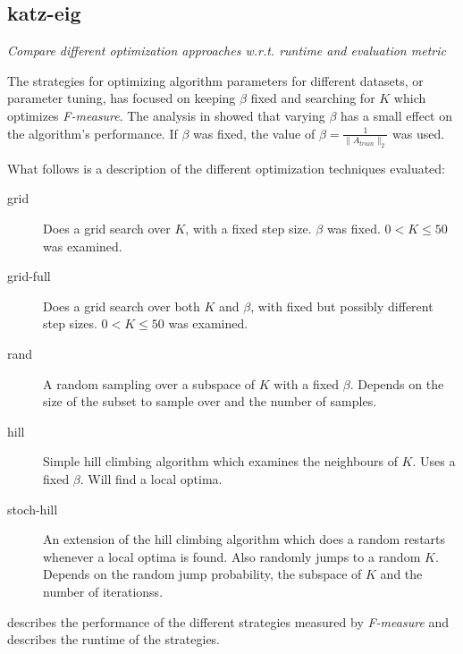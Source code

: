 
\subsection{katz-eig}

\textit{Compare different optimization approaches w.r.t. runtime and evaluation metric}

The strategies for optimizing algorithm parameters for different datasets, or parameter tuning, has focused on keeping $\beta$ fixed and searching for $K$ which optimizes \textit{F-measure}. The analysis in  showed that varying $\beta$ has a small effect on the algorithm's performance. If $\beta$ was fixed, the value of $\beta = \frac{1}{\|A_{train}\|_2}$ was used.

What follows is a description of the different optimization techniques evaluated:

\begin{description}
    \item[grid]
        Does a grid search over $K$, with a fixed step size. $\beta$ was fixed. $0 < K \leq 50$ was examined.
    \item[grid-full]
        Does a grid search over both $K$ and $\beta$, with fixed but possibly different step sizes. $0 < K \leq 50$ was examined.
    \item[rand]
        A random sampling over a subspace of $K$ with a fixed $\beta$. Depends on the size of the subset to sample over and the number of samples.
    \item[hill]
        Simple hill climbing algorithm which examines the neighbours of $K$. Uses a fixed $\beta$. Will find a local optima.
    \item[stoch-hill]
        An extension of the hill climbing algorithm which does a random restarts whenever a local optima is found. Also randomly jumps to a random $K$. Depends on the random jump probability, the subspace of $K$ and the number of iterationss.
\end{description}

 describes the performance of the different strategies measured by \textit{F-measure} and  describes the runtime of the strategies.

